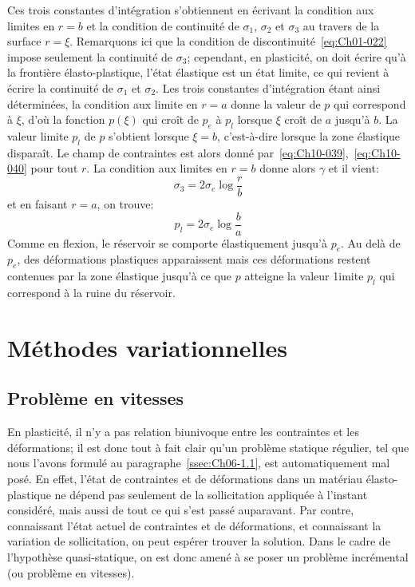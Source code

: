 Ces trois constantes d'intégration s'obtiennent en écrivant la condition aux limites en $r=b$ et la condition de continuité de $\sigma_1$, $\sigma_2$ et $\sigma_3$ au travers de la surface $r=\xi$.
Remarquons ici que la condition de discontinuité~\eqref{eq:Ch01-022} impose seulement la continuité de $\sigma_3$; cependant, en plasticité, on doit écrire qu'à la frontière élasto-plastique, l'état élastique est un état limite, ce qui revient à écrire la continuité de $\sigma_1$ et $\sigma_2$.
Les trois constantes d'intégration étant ainsi déterminées, la condition aux limite en $r = a$ donne la valeur de $p$ qui correspond à $\xi$, d'où la fonction $p(\xi)$ qui croît de $p_e$ à $p_l$ lorsque $\xi$ croît de $a$ jusqu'à $b$.
La valeur limite $p_l$ de $p$ s'obtient lorsque $\xi=b$, c'est-à-dire lorsque la zone élastique disparaît.
Le champ de contraintes est alors donné par~\eqref{eq:Ch10-039},~\eqref{eq:Ch10-040} pour tout $r$.
La condition aux limites en $r=b$ donne alors $\gamma$ et il vient: 
\begin{equation}
    \sigma_3 = 2 \sigma_e \log \frac{r}{b}
    \label{eq:Ch10-041}
\end{equation}
et en faisant $r=a$, on trouve: 
\begin{equation}
    p_l = 2 \sigma_e \log \frac{b}{a}
    \label{eq:Ch10-042}
\end{equation}
Comme en flexion, le réservoir se comporte élastiquement jusqu'à $p_e$.
Au delà de $p_e$, des déformations plastiques apparaissent mais ces déformations restent contenues par la zone élastique jusqu'à ce que $p$ atteigne la valeur 1imite $p_l$ qui correspond à la ruine du réservoir. 

\section{Méthodes variationnelles} \label{sec:Ch10-3}
\subsection{Problème en vitesses} \label{ssec:Ch10-3.1}
En plasticité, il n'y a pas relation biunivoque entre les contraintes et les déformations; il est donc tout à fait clair qu'un problème statique régulier, tel que nous l'avons formulé au paragraphe~\ref{ssec:Ch06-1.1}, est automatiquement mal posé. 
En effet, l'état de contraintes et de déformations dans un matériau élasto-plastique ne dépend pas seulement de la sollicitation appliquée à l'instant considéré, mais aussi de tout ce qui s'est passé auparavant.
Par contre, connaissant l'état actuel de contraintes et de déformations, et connaissant la variation de sollicitation, on peut espérer trouver la solution.
Dans le cadre de l'hypothèse quasi-statique, on est donc amené à se poser un problème incrémental (ou problème en vitesses). 

